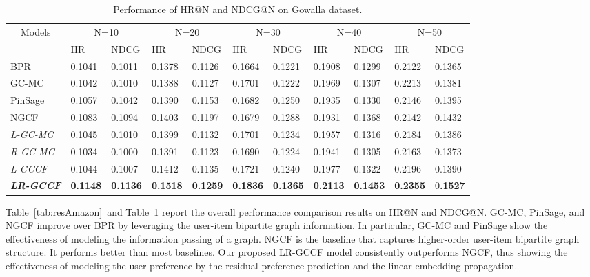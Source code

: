 \documentclass[letterpaper]{article} %
\begin{document}
\begin{small} 
\begin{table}[h]
\footnotesize
\centering
\caption{Performance of HR@N and NDCG@N on Gowalla dataset.}\label{tab:resGowalla} 
\begin{tabular}{|l|l|l|l|l|l|l|l|l|l|l|}
\hline
\multicolumn{1}{|c|}{\multirow{2}{*}{Models}} & \multicolumn{2}{c|}{N=10} & \multicolumn{2}{c|}{N=20} & \multicolumn{2}{c|}{N=30} & \multicolumn{2}{c|}{N=40} & \multicolumn{2}{c|}{N=50} \\ \cline{2-11} 
\multicolumn{1}{|c|}{} & HR & NDCG & HR & NDCG & HR & NDCG & HR & NDCG & HR & NDCG \\ \hline
BPR & 0.1041 & 0.1011 & 0.1378 & 0.1126 & 0.1664 & 0.1221 & 0.1908 & 0.1299 & 0.2122 & 0.1365 \\ \hline 
GC-MC & 0.1042 & 0.1010 & 0.1388 & 0.1127 & 0.1701 & 0.1222 & 0.1969 & 0.1307 & 0.2213 & 0.1381 \\ \hline
PinSage & 0.1057 & 0.1042 & 0.1390 & 0.1153 & 0.1682 & 0.1250 & 0.1935 & 0.1330 & 0.2146 & 0.1395 \\ \hline
NGCF & 0.1083 & 0.1094 & 0.1403 & 0.1197 & 0.1679 & 0.1288 & 0.1931 & 0.1368 & 0.2142 & 0.1432 \\ \hline
\emph{L-GC-MC} & 0.1045 & 0.1010 & 0.1399 & 0.1132 & 0.1701 & 0.1234 & 0.1957 & 0.1316 & 0.2184 & 0.1386 \\ \hline
\emph{R-GC-MC} & 0.1034 & 0.1000 & 0.1391 & 0.1123 & 0.1690 & 0.1224 & 0.1941 & 0.1305 & 0.2163 & 0.1373 \\ \hline 
\emph{L-GCCF} & 0.1044 & 0.1007 & 0.1412 & 0.1135 & 0.1721 & 0.1240 & 0.1977 & 0.1322 & 0.2196 & 0.1390 \\ \hline
\emph{\textbf{LR-GCCF}} & \textbf{0.1148} & \textbf{0.1136} & \textbf{0.1518} & \textbf{0.1259} & \textbf{0.1836} & \textbf{0.1365} & \textbf{0.2113} & \textbf{0.1453} & \textbf{0.2355} & 0\textbf{.1527} \\ \hline
\end{tabular} 
\end{table} 
\end{small}
 
 
 
Table~\ref{tab:resAmazon}~and Table~\ref{tab:resGowalla} report the overall performance comparison results on HR@N and NDCG@N. GC-MC, PinSage, and NGCF improve over BPR by leveraging the user-item bipartite graph information. In particular, GC-MC and PinSage show the effectiveness of modeling the information passing of a graph.  NGCF is the baseline that captures higher-order user-item bipartite graph structure. It performs better than most baselines. Our proposed LR-GCCF model consistently outperforms NGCF, thus showing the effectiveness of modeling the user preference by the residual preference prediction and the linear embedding propagation.
\end{document}
